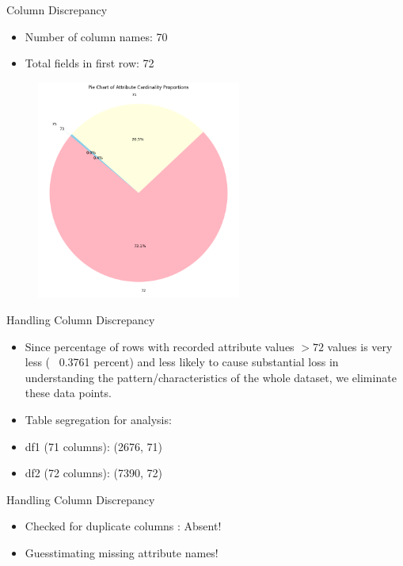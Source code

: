 \documentclass{beamer}
\begin{document}
\begin{frame}{Column Discrepancy}
\begin{itemize}
\item Number of column names: 70
\item Total fields in first row: 72
\end{itemize}
\begin{figure}
    \centering
    \includegraphics[width=0.6\textwidth]{slide_image/pie.png}
\end{figure}
\end{frame}


\begin{frame}{Handling Column Discrepancy}
\begin{itemize}
    \item Since percentage of rows with recorded attribute values $>72$ values is very less (~ 0.3761 percent) and less likely to cause substantial loss in understanding the pattern/characteristics of the whole dataset, we eliminate these data points.
    \item Table segregation for analysis:
    \item df1 (71 columns): (2676, 71)
    \item df2 (72 columns): (7390, 72)
\end{itemize}
\end{frame}

\begin{frame}{Handling Column Discrepancy}
\begin{itemize}
    \item Checked for duplicate columns : Absent!
    \item Guesstimating missing attribute names!
\end{itemize}
\end{frame}
\end{document}
